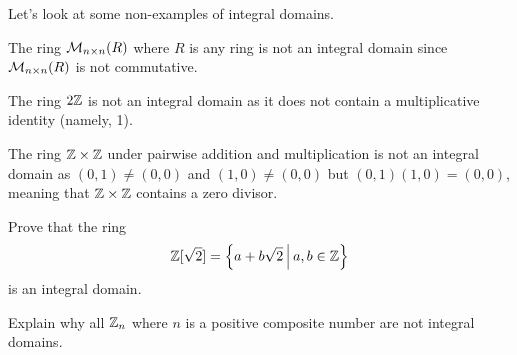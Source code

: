Let's look at some non-examples of integral domains.
\begin{example}
    The ring $\mathcal{M}_{n\times n}(R)$ where $R$ is any ring is not an integral domain since $\mathcal{M}_{n\times n}(R)$ is not commutative.
\end{example}
\begin{example}
    The ring $2\mathbb{Z}$ is not an integral domain as it does not contain a multiplicative identity (namely, 1).
\end{example}
\begin{example}
    The ring $\mathbb{Z} \times \mathbb{Z}$ under pairwise addition and multiplication is not an integral domain as $(0,1) \neq (0, 0)$ and $(1, 0) \neq (0, 0)$ but $(0,1)(1,0) = (0, 0)$, meaning that $\mathbb{Z} \times \mathbb{Z}$ contains a zero divisor.
\end{example}

\begin{exercise}
    Prove that the ring
    \[
        \Z[\sqrt2] = \left\{a + b\sqrt2 \vert a,b \in \Z\right\}
    \]
    is an integral domain.
\end{exercise}
\begin{exercise}
    Explain why all $\mathbb{Z}_n$ where $n$ is a positive composite number are not integral domains.
\end{exercise}

